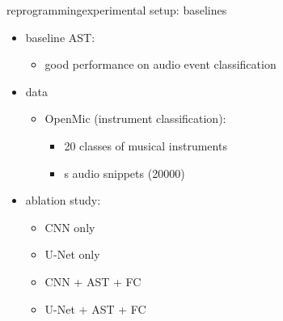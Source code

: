 \begin{frame}{reprogramming}{experimental setup: baselines}
    \vspace{-3mm}
    \begin{itemize}
        \item baseline AST:
            \begin{itemize}
                \item   good performance on audio event classification
            \end{itemize}
        \bigskip
        \item data
            \begin{itemize}
                \item   OpenMic (instrument classification):
                    \begin{itemize}
                        \item   20 classes of musical instruments
                        \item   \unit[10]{s} audio snippets (20000)
                    \end{itemize}
            \end{itemize}
        \bigskip
        \item   ablation study:
            \begin{itemize}
                \item   CNN only
                \item   U-Net only
                \item   CNN + AST + FC
                \item   U-Net + AST + FC
            \end{itemize}
    \end{itemize}
\end{frame}

